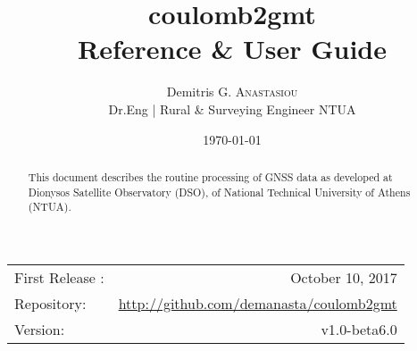 \documentclass{article}
\title{coulomb2gmt \\ Reference \& User Guide} %
\author{Demitris G. \textsc{Anastasiou} \\ \scriptsize{Dr.Eng | Rural \& Surveying Engineer NTUA} } %
\date{\today} %
\begin{document}
\maketitle %
\begin{center}
\begin{tabular}{l r}
First Release : & October 10, 2017 \\
Repository:    & \url{http://github.com/demanasta/coulomb2gmt} \\
Version:        & v1.0-beta6.0
\end{tabular}
\end{center}

\begin{abstract}
{\small 
This document describes the routine processing of GNSS data as developed at Dionysos Satellite Observatory (DSO), of National Technical University
of Athens (NTUA).
}
\end{abstract}
\clearpage

\tableofcontents
\clearpage


\end{document}
